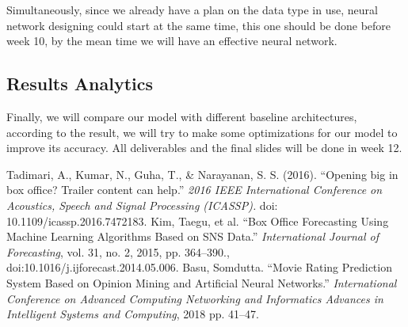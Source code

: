 \documentclass[conference]{IEEEtran}
\begin{document}
Simultaneously, since we already have a plan on the data type in use, neural network designing could start at the same time, this one should be done before week 10, by the mean time we will have an effective neural network.

\subsection{Results Analytics}

Finally, we will compare our model with different baseline architectures, according to the result, we will try to make some optimizations for our model to improve its accuracy. All deliverables and the final slides will be done in week 12.

\begin{thebibliography}{00}
  
   Tadimari, A., Kumar, N., Guha, T., \& Narayanan, S. S. (2016). ``Opening big in box office? Trailer content can help.'' \emph{2016 IEEE International Conference on Acoustics, Speech and Signal Processing (ICASSP).} doi: 10.1109/icassp.2016.7472183.
   Kim, Taegu, et al. ``Box Office Forecasting Using Machine Learning Algorithms Based on SNS Data.'' \emph{International Journal of Forecasting}, vol. 31, no. 2, 2015, pp. 364–390., doi:10.1016/j.ijforecast.2014.05.006.
   Basu, Somdutta. ``Movie Rating Prediction System Based on Opinion Mining and Artificial Neural Networks.'' \emph{International Conference on Advanced Computing Networking and Informatics Advances in Intelligent Systems and Computing}, 2018 pp. 41–47.

\end{thebibliography}
\end{document}
